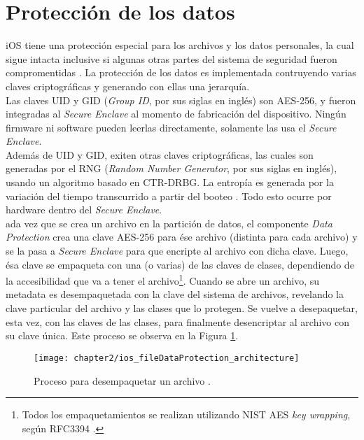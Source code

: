 \section{Protección de los datos} \label{fig:ch02:data-protection}
iOS tiene una protección especial para los archivos y los datos personales, la cual sigue intacta inclusive si algunas otras partes del sistema de seguridad fueron compromentidas \cite{asg}. La protección de los datos es implementada contruyendo varias claves criptográficas y generando con ellas una jerarquía.\\
Las claves UID y GID (\textit{Group ID}, por sus siglas en ingl\'es) son AES-256, y fueron integradas al \textit{Secure Enclave} al momento de fabricación del dispositivo. Ningún firmware ni software pueden leerlas directamente, solamente las usa el \textit{Secure Enclave}.\\
Además de UID y GID, exiten otras claves criptográficas, las cuales son generadas por el RNG (\textit{Random Number Generator}, por sus siglas en ingl\'es), usando un algoritmo basado en CTR-DRBG. La entropía es generada por la variación del tiempo transcurrido a partir del booteo \cite{asg}. Todo esto ocurre por hardware dentro del \textit{Secure Enclave}.\\
ada vez que se crea un archivo en la partición de datos, el componente \textit{Data Protection} crea una clave AES-256 para ése archivo (distinta para cada archivo) y se la pasa a \textit{Secure Enclave} para que encripte al archivo con dicha clave. Luego, ésa clave se empaqueta con una (o varias) de las claves de clases, dependiendo de la accesibilidad que va a tener el archivo\footnote{Todos los empaquetamientos se realizan utilizando NIST AES \textit{key wrapping}, según RFC3394 \cite{asg}.}.
Cuando se abre un archivo, su metadata es desempaquetada con la clave del sistema de archivos, revelando la clave particular del archivo y las clases que lo protegen. Se vuelve a desepaquetar, esta vez, con las claves de las clases, para finalmente desencriptar al archivo con su clave única. Este proceso se observa en la Figura \ref{fig:ch02:dataProtection}.
\begin{figure}[hbtp]
    \centering
    \texttt{[image: chapter2/ios\_fileDataProtection\_architecture]}
    \caption{Proceso para desempaquetar un archivo \cite{asg}.}
    \label{fig:ch02:dataProtection}
\end{figure}

